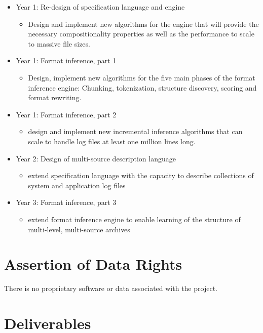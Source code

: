 \documentclass[12pt]{article}
\begin{document}
\begin{itemize}
\item Year 1:  Re-design of \pads{} specification language and engine
  \begin{itemize}
    \item Design and implement new algorithms for
            the \pads{} engine that will provide the necessary compositionality 
            properties as well as the performance to scale to massive file sizes.
  \end{itemize}
\item Year 1:  Format inference, part 1
  \begin{itemize}
    \item Design, implement new algorithms for the five main phases of the format inference 
      engine: Chunking, tokenization, structure discovery, scoring and format rewriting.
  \end{itemize}
\item Year 1:  Format inference, part 2
  \begin{itemize}
    \item design and implement new incremental inference algorithms that can
      scale to handle log files at least one million lines long.
  \end{itemize}
\item Year 2:  Design of multi-source description language
  \begin{itemize}
    \item extend \pads{} specification language with the capacity to describe
          collections of system and application log files 
  \end{itemize}  
\item Year 3:  Format inference, part 3
  \begin{itemize}
    \item extend format inference engine to enable learning of the structure
       of multi-level, multi-source archives
  \end{itemize}
\end{itemize}

\section{Assertion of Data Rights}

There is no proprietary software or data associated with the project.

\section{Deliverables}
\end{document}
